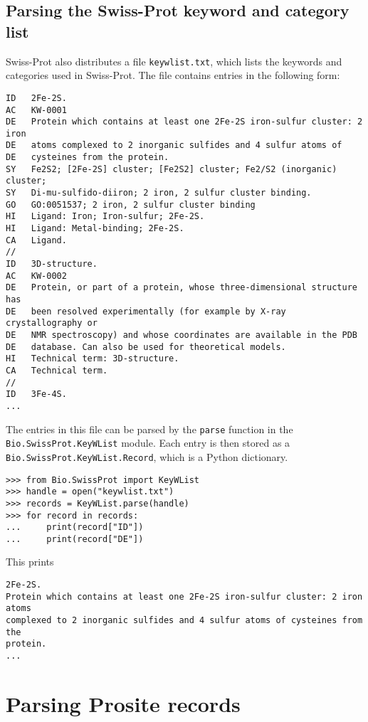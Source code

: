 \subsection{Parsing the Swiss-Prot keyword and category list}

Swiss-Prot also distributes a file \verb+keywlist.txt+, which lists the keywords and categories used in Swiss-Prot. The file contains entries in the following form:

\begin{verbatim}
ID   2Fe-2S.
AC   KW-0001
DE   Protein which contains at least one 2Fe-2S iron-sulfur cluster: 2 iron
DE   atoms complexed to 2 inorganic sulfides and 4 sulfur atoms of
DE   cysteines from the protein.
SY   Fe2S2; [2Fe-2S] cluster; [Fe2S2] cluster; Fe2/S2 (inorganic) cluster;
SY   Di-mu-sulfido-diiron; 2 iron, 2 sulfur cluster binding.
GO   GO:0051537; 2 iron, 2 sulfur cluster binding
HI   Ligand: Iron; Iron-sulfur; 2Fe-2S.
HI   Ligand: Metal-binding; 2Fe-2S.
CA   Ligand.
//
ID   3D-structure.
AC   KW-0002
DE   Protein, or part of a protein, whose three-dimensional structure has
DE   been resolved experimentally (for example by X-ray crystallography or
DE   NMR spectroscopy) and whose coordinates are available in the PDB
DE   database. Can also be used for theoretical models.
HI   Technical term: 3D-structure.
CA   Technical term.
//
ID   3Fe-4S.
...
\end{verbatim}

The entries in this file can be parsed by the \verb+parse+ function in the \verb+Bio.SwissProt.KeyWList+ module. Each entry is then stored as a \verb+Bio.SwissProt.KeyWList.Record+, which is a Python dictionary.

\begin{verbatim}
>>> from Bio.SwissProt import KeyWList
>>> handle = open("keywlist.txt")
>>> records = KeyWList.parse(handle)
>>> for record in records:
...     print(record["ID"])
...     print(record["DE"])
\end{verbatim}

This prints
\begin{verbatim}
2Fe-2S.
Protein which contains at least one 2Fe-2S iron-sulfur cluster: 2 iron atoms
complexed to 2 inorganic sulfides and 4 sulfur atoms of cysteines from the
protein.
...
\end{verbatim}

\section{Parsing Prosite records}

